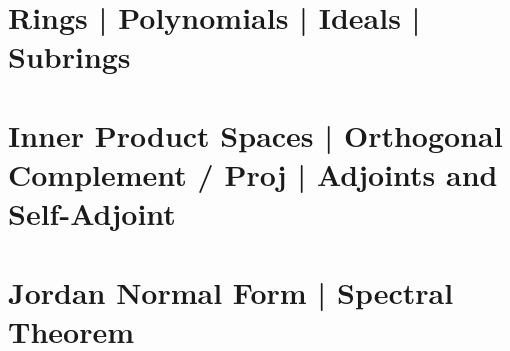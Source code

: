 \documentclass[9pt]{article}
\begin{document}
\section{Rings | Polynomials | Ideals | Subrings}

\section{Inner Product Spaces | Orthogonal Complement / Proj | Adjoints and Self-Adjoint}

\section{Jordan Normal Form | Spectral Theorem}








\end{document}
